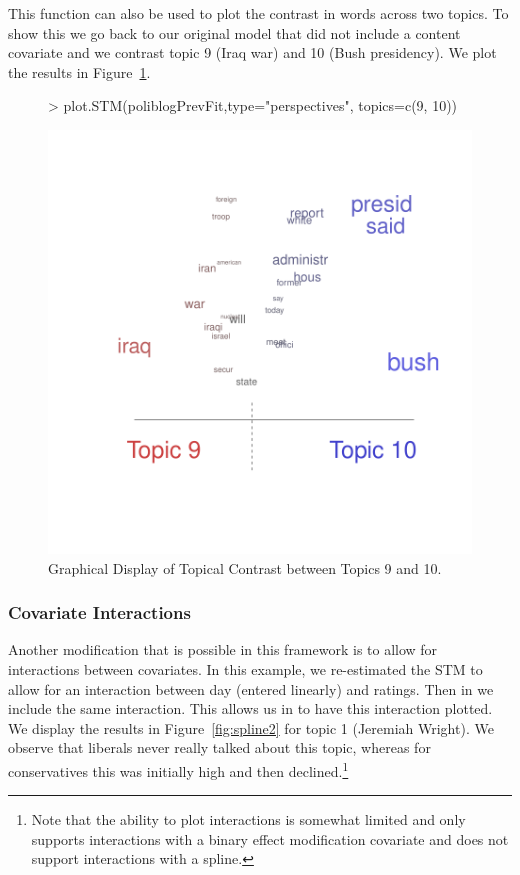 \documentclass[nojss]{jss}
\begin{document}
This function can also be used to plot the contrast in words across two topics. To show this we go back to our original model that did not include a content covariate and we contrast topic 9 (Iraq war) and 10 (Bush presidency). We plot the results in Figure~\ref{fig:perp2}.
\begin{figure}[t!]
\begin{center}
\begin{Schunk}
\begin{Sinput}
> plot.STM(poliblogPrevFit,type="perspectives", topics=c(9, 10))
\end{Sinput}
\end{Schunk}
\includegraphics{stmVignette-018}
\caption{Graphical Display of Topical Contrast between Topics 9 and 10.}
\label{fig:perp2}
\end{center}
\end{figure}

\subsubsection{Covariate Interactions}

Another modification that is possible in this framework is to allow for interactions between covariates. In this example, we re-estimated the STM to allow for an interaction between day (entered linearly) and ratings. Then in  we include the same interaction. This allows us in  to have this interaction plotted. We display the results in Figure~\ref{fig:spline2} for topic 1 (Jeremiah Wright). We observe that liberals never really talked about this topic, whereas for conservatives this was initially high and then declined.\footnote{Note that the ability to plot interactions is somewhat limited and only supports interactions with a binary effect modification covariate and does not support interactions with a spline.}
\end{document}
